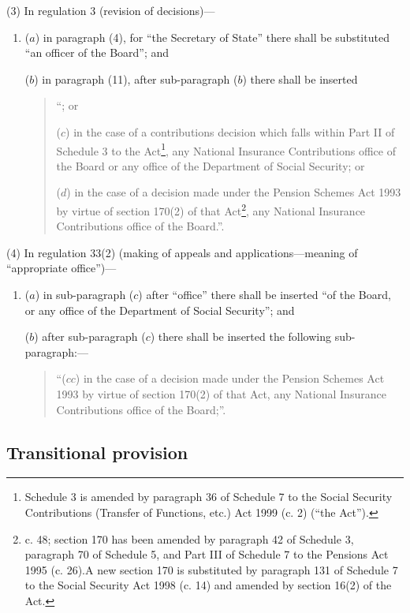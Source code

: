 \documentclass[12pt,a4paper]{article}
\begin{document}
(3) In regulation 3 (revision of decisions)—
\begin{enumerate}\item[]
($a$) in paragraph (4), for “the Secretary of State” there shall be substituted “an officer of the Board”; and

($b$) in paragraph (11), after sub-paragraph ($b$)  there shall be inserted
\begin{quotation}
    “; or

    ($c$) 
    in the case of a contributions decision which falls within Part II of Schedule 3 to the Act\footnote{\frenchspacing Schedule 3 is amended by paragraph 36 of Schedule 7 to the Social Security Contributions (Transfer of Functions, etc.) Act 1999 (c. 2) (“the Act”).}, any National Insurance Contributions office of the Board or any office of the Department of Social Security; or

    ($d$) 
    in the case of a decision made under the Pension Schemes Act 1993 by virtue of section 170(2) of that Act\footnote{ c. 48; section 170 has been amended by paragraph 42 of Schedule 3, paragraph 70 of Schedule 5, and Part III of Schedule 7 to the Pensions Act 1995 (c. 26).\@ A new section 170 is substituted by paragraph 131 of Schedule 7 to the Social Security Act 1998 (c. 14) and amended by section 16(2) of the Act.}, any National Insurance Contributions office of the Board.”. 
\end{quotation}
\end{enumerate}

(4) In regulation 33(2) (making of appeals and applications—meaning of “appropriate office”)—
\begin{enumerate}\item[]
($a$) in sub-paragraph ($c$)  after “office” there shall be inserted “of the Board, or any office of the Department of Social Security”; and

($b$) after sub-paragraph ($c$)  there shall be inserted the following sub-paragraph:—
\begin{quotation}
“($cc$) in the case of a decision made under the Pension Schemes Act 1993 by virtue of section 170(2) of that Act, any National Insurance Contributions office of the Board;”.
\end{quotation}
\end{enumerate}

\subsection[4. Transitional provision]{Transitional provision}
\end{document}
